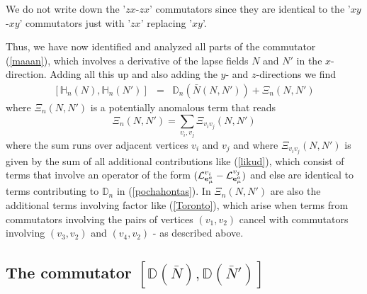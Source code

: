 \documentclass[12pt]{article}
\newcommand{\nn}{\nonumber}
\def\m{\mu}
\def\cl{{\cal L}}
\begin{document}
\begin{appendix}
We do not write down the '$zx$-$zx$' commutators since they are identical to the '$xy$-$xy$' commutators just with '$zx$' replacing '$xy$'. 









Thus, we have now identified and analyzed all parts of the commutator (\ref{maaan}), which involves a derivative of the lapse fields $N$ and $N'$ in the $x$-direction. Adding all this up and also adding the $y$- and $z$-directions we find
\begin{eqnarray}
\left[\mathds{H}_n(N), \mathds{H}_n(N')\right] &=& \mathds{D}_n (\bar{N}(N,N')) + \Xi_n(N,N')
\nn
\end{eqnarray}
where $\Xi_n(N,N')$ is a potentially anomalous term that reads
\begin{equation}
\Xi_n(N,N') = \sum_{v_i, v_j} \Xi_{v_iv_j}(N,N')
\label{kreditkarte}
\end{equation}
where the sum runs over adjacent vertices $v_i$ and $v_j$ and where $\Xi_{v_iv_j}(N,N')$ is given by the sum of all additional contributions like (\ref{likud}), which consist of terms that involve an operator of the form $(\cl^{v_i}_{{\bf e}^a_\m} -\cl^{v_j}_{{\bf e}^a_\m} )$ and else are identical to terms contributing to $\mathds{D}_n $ in (\ref{pochahontas}). In $\Xi_n(N,N')$ are also the additional terms involving factor like (\ref{Toronto}), which arise when terms from commutators involving the pairs of vertices $(v_1,v_2)$ cancel with commutators involving $(v_3,v_2)$ and $(v_4,v_2)$ - as described above.



















\subsection{The commutator $[\mathds{D}(\bar{N}),\mathds{D}(\bar{N}')]$}
\label{appendixhamm}




\end{appendix}
\end{document}
